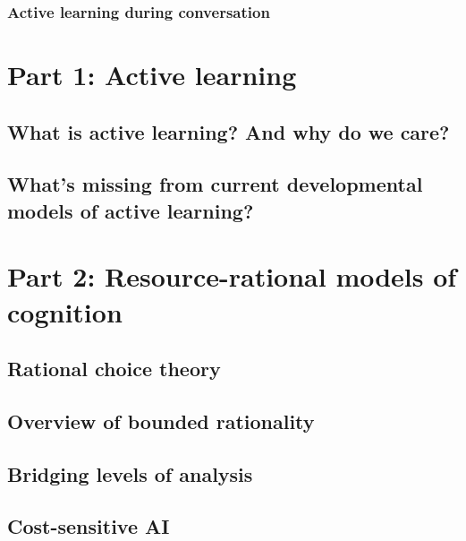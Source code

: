 \documentclass[a4paper,man,apacite,floatsintext]{apa6}
\begin{document}
\subsubsection{Active learning during
conversation}\label{active-learning-during-conversation}

\section{Part 1: Active learning}\label{part-1-active-learning}

\subsection{What is active learning? And why do we
care?}\label{what-is-active-learning-and-why-do-we-care}

\subsection{What's missing from current developmental models of active
learning?}\label{whats-missing-from-current-developmental-models-of-active-learning}

\section{Part 2: Resource-rational models of
cognition}\label{part-2-resource-rational-models-of-cognition}

\subsection{Rational choice theory}\label{rational-choice-theory}

\subsection{Overview of bounded
rationality}\label{overview-of-bounded-rationality}

\subsection{Bridging levels of
analysis}\label{bridging-levels-of-analysis}

\subsection{Cost-sensitive AI}\label{cost-sensitive-ai}
\end{document}
